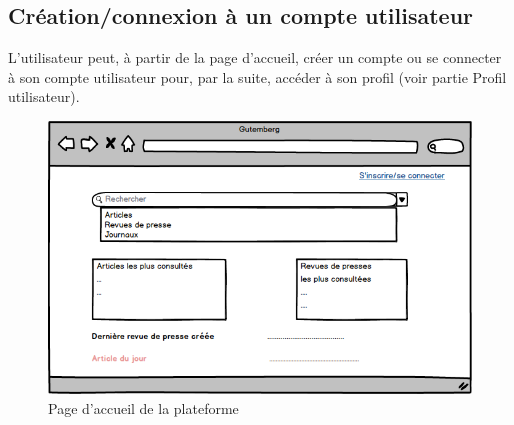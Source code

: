 \subsection{Création/connexion à un compte utilisateur}
\label{sec:arrivee_utilisateur}
L’utilisateur peut, à partir de la page d'accueil, créer un compte ou se connecter à son compte utilisateur pour, par la suite, accéder à son profil (voir partie Profil utilisateur).

    \begin{figure}[H]
        \centering
        \includegraphics[width=\textwidth]{figures/Accueil.png}
            \caption{Page d'accueil de la plateforme}
            \label{fig:accueil}
    \end{figure}
